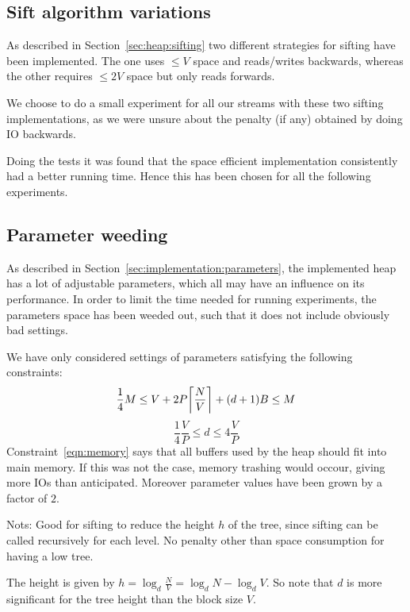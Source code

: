 
\subsection{Sift algorithm variations}
As described in Section~\ref{sec:heap:sifting} two different strategies for sifting have been implemented. The one uses $\leq V$ space and reads/writes backwards, whereas the other requires $\leq 2V$ space but only reads forwards.

We choose to do a small experiment for all our streams with these two sifting implementations, as we were unsure about the penalty (if any) obtained by doing IO backwards.

Doing the tests it was found that the space efficient implementation consistently had a better running time. Hence this has been chosen for all the following experiments.

\subsection{Parameter weeding}
As described in Section~\ref{sec:implementation:parameters}, the implemented heap has a lot of adjustable parameters, which all may have an influence on its performance. In order to limit the time needed for running experiments, the parameters space has been weeded out, such that it does not include obviously bad settings.

We have only considered settings of parameters satisfying the following constraints:
\begin{equation}
  \label{eqn:memory}
  \frac{1}{4}M \leq V + 2P \ceil*{\frac{N}{V}} + (d + 1)B \leq M
\end{equation}
\begin{equation}
  \label{eqn:fanout}
  \frac{1}{4} \frac{V}{P} \leq d \leq 4 \frac{V}{P}
\end{equation}
Constraint~\ref{eqn:memory} says that all buffers used by the heap should fit into main memory. If this was not the case, memory trashing would occour, giving more IOs than anticipated. Moreover parameter values have been grown by a factor of $2$.


Nots:
Good for sifting to reduce the height $h$ of the tree, since sifting can be called recursively for each level. No penalty other than space consumption for having a low tree.

The height is given by $h = \log_d{\frac{N}{V}} = \log_d{N} - \log_d{V}$. So note that $d$ is more significant for the tree height than the block size $V$.


